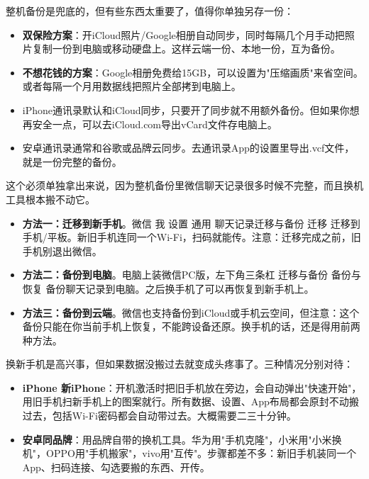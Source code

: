 
整机备份是兜底的，但有些东西太重要了，值得你单独另存一份：


\begin{itemize}
  \item \textbf{双保险方案}：开iCloud照片/Google相册自动同步，同时每隔几个月手动把照片复制一份到电脑或移动硬盘上。这样云端一份、本地一份，互为备份。
  \item \textbf{不想花钱的方案}：Google相册免费给15GB，可以设置为"压缩画质"来省空间。或者每隔一个月用数据线把照片全部拷到电脑上。
\end{itemize}


\begin{itemize}
  \item iPhone通讯录默认和iCloud同步，只要开了同步就不用额外备份。但如果你想再安全一点，可以去iCloud.com导出vCard文件存电脑上。
  \item 安卓通讯录通常和谷歌或品牌云同步。去通讯录App的设置里导出.vcf文件，就是一份完整的备份。
\end{itemize}


这个必须单独拿出来说，因为整机备份里微信聊天记录很多时候不完整，而且换机工具根本搬不动它。

\begin{itemize}
  \item \textbf{方法一：迁移到新手机}。微信 我 设置 通用 聊天记录迁移与备份 迁移 迁移到手机/平板。新旧手机连同一个Wi-Fi，扫码就能传。注意：迁移完成之前，旧手机别退出微信。
  \item \textbf{方法二：备份到电脑}。电脑上装微信PC版，左下角三条杠 迁移与备份 备份与恢复 备份聊天记录到电脑。之后换手机了可以再恢复到新手机上。
  \item \textbf{方法三：备份到云端}。微信也支持备份到iCloud或手机云空间，但注意：这个备份只能在你当前手机上恢复，不能跨设备还原。换手机的话，还是得用前两种方法。
\end{itemize}


换新手机是高兴事，但如果数据没搬过去就变成头疼事了。三种情况分别对待：


\begin{itemize}
  \item \textbf{iPhone 新iPhone}：开机激活时把旧手机放在旁边，会自动弹出"快速开始"，用旧手机扫新手机上的图案就行。所有数据、设置、App布局都会原封不动搬过去，包括Wi-Fi密码都会自动带过去。大概需要二三十分钟。
  \item \textbf{安卓同品牌}：用品牌自带的换机工具。华为用"手机克隆"，小米用"小米换机"，OPPO用"手机搬家"，vivo用"互传"。步骤都差不多：新旧手机装同一个App、扫码连接、勾选要搬的东西、开传。
\end{itemize}

